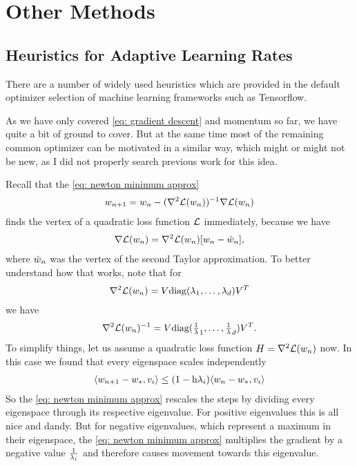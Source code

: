 \chapter{Other Methods}


\section{Heuristics for Adaptive Learning Rates}
\label{sec: heuristics for adpative learning rates}

There are a number of widely used heuristics which are provided in the
default optimizer selection of machine learning frameworks such as Tensorflow.

As we have only covered \ref{eq: gradient descent} and momentum so far, we have
quite a bit of ground to cover. But at the same time most of the remaining
common optimizer \parencite[as reviewed by e.g.][]{ruderOverviewGradientDescent2017}
can be motivated in a similar way, which might or might not be new, as I did not
properly search previous work for this idea.

Recall that the \ref{eq: newton minimum approx}
\begin{align*}
	w_{n+1}	= w_n - (\nabla^2\mathcal{L}(w_n))^{-1}\nabla\mathcal{L}(w_n)
\end{align*}
finds the vertex of a quadratic loss function \(\mathcal{L}\) immediately, because we
have
\begin{align*}
	\nabla\mathcal{L}(w_n) = \nabla^2\mathcal{L}(w_n)[w_n - \hat{w}_n],
\end{align*}
where \(\hat{w}_n\) was the vertex of the second Taylor approximation.
To better understand how that works, note that for
\begin{align*}
	\nabla^2\mathcal{L}(w_n) = V \text{diag}(\lambda_1,\dots,\lambda_d)V^T
\end{align*}
we have
\begin{align*}
	\nabla^2\mathcal{L}(w_n)^{-1}
	= V \text{diag}(\tfrac1{\lambda}_1,\dots,\tfrac1{\lambda}_d)V^T.
\end{align*}
To simplify things, let us assume a quadratic loss function
\(H=\nabla^2\mathcal{L}(w_n)\) now.  In this case we found that every
eigenspace scales independently
\begin{align*}
	\langle w_{n+1} - w_*, v_i \rangle
	\le (1-\text{h} \lambda_i)\langle w_n - w_*, v_i \rangle
\end{align*}
So the \ref{eq: newton minimum approx} rescales the steps by dividing every
eigenspace through its respective eigenvalue. For positive eigenvalues this is
all nice and dandy. But for negative eigenvalues, which represent a maximum in
their eigenspace, the \ref{eq: newton minimum approx} multiplies the gradient by
a negative value \(\tfrac1{\lambda_i}\) and therefore causes movement towards
this eigenvalue.

